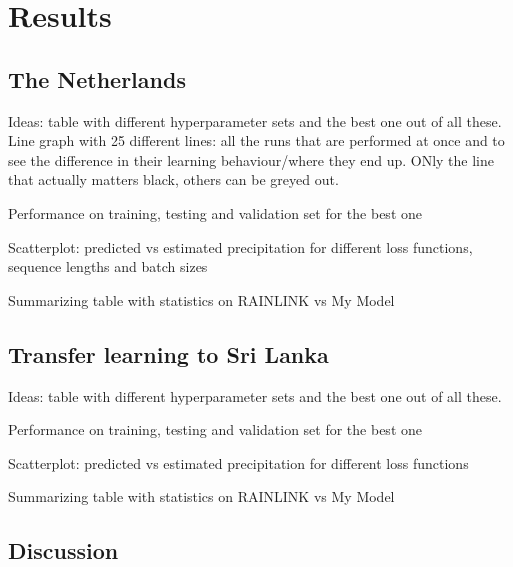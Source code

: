 \documentclass[twocolumn, 10pt, a4paper]{memoir}
\begin{document}
	
	\chapter{Results} \label{ch: results}
	\section{The Netherlands}
	Ideas: table with different hyperparameter sets and the best one out of all these.
	Line graph with 25 different lines: all the runs that are performed at once and to see the difference in their learning behaviour/where they end up. ONly the line that actually matters black, others can be greyed out.
	
	Performance on training, testing and validation set for the best one
	
	Scatterplot: predicted vs estimated precipitation for different loss functions, sequence lengths and batch sizes
	
	Summarizing table with statistics on RAINLINK vs My Model
	
	\section{Transfer learning to Sri Lanka}
	Ideas: table with different hyperparameter sets and the best one out of all these.
	
	Performance on training, testing and validation set for the best one
	
	Scatterplot: predicted vs estimated precipitation for different loss functions
	
	Summarizing table with statistics on RAINLINK vs My Model
	
	\section{Discussion} \label{ch: discussion}
\end{document}
